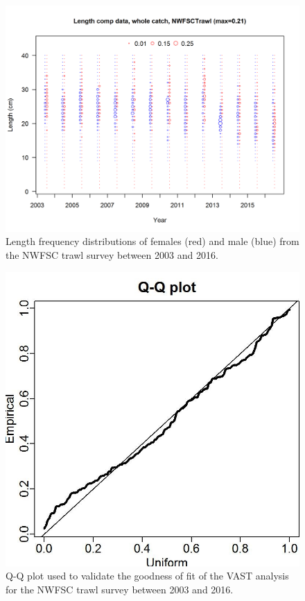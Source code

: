 \documentclass[12pt,]{article}
\begin{document}
\begin{figure}[htbp]
\centering
\includegraphics{r4ss/plots_mod1/comp_lendat_bubflt8mkt0.png}
\caption{Length frequency distributions of females (red) and male (blue)
from the NWFSC trawl survey between 2003 and 2016.
\label{fig:Fleet8_comp_lendat_bubflt8mkt0}}
\end{figure}

\begin{figure}[htbp]
\centering
\includegraphics{Figures/NWFSCtrawl_QQ.jpg}
\caption{Q-Q plot used to validate the goodness of fit of the VAST
analysis for the NWFSC trawl survey between 2003 and 2016.
\label{fig:Fleet8_NWFSCtrawl_QQ}}
\end{figure}
\end{document}
